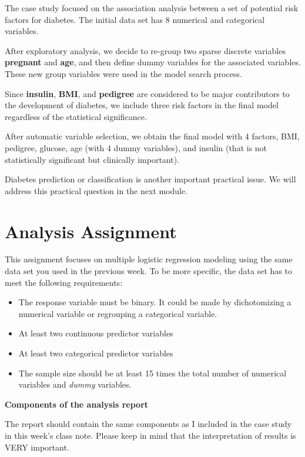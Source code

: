 \documentclass[
]{book}
\begin{document}
The case study focused on the association analysis between a set of potential risk factors for diabetes. The initial data set has 8 numerical and categorical variables.

After exploratory analysis, we decide to re-group two sparse discrete variables \textbf{pregnant} and \textbf{age}, and then define dummy variables for the associated variables. These new group variables were used in the model search process.

Since \textbf{insulin}, \textbf{BMI}, and \textbf{pedigree} are considered to be major contributors to the development of diabetes, we include three risk factors in the final model regardless of the statistical significance.

After automatic variable selection, we obtain the final model with 4 factors, BMI, pedigree, glucose, age (with 4 dummy variables), and insulin (that is not statistically significant but clinically important).

Diabetes prediction or classification is another important practical issue. We will address this practical question in the next module.

\hypertarget{analysis-assignment-1}{%
\section{Analysis Assignment}\label{analysis-assignment-1}}

This assignment focuses on multiple logistic regression modeling using the same data set you used in the previous week. To be more specific, the data set has to meet the following requirements:

\begin{itemize}
\item
  The response variable must be binary. It could be made by dichotomizing a numerical variable or regrouping a categorical variable.
\item
  At least two continuous predictor variables
\item
  At least two categorical predictor variables
\item
  The sample size should be at least 15 times the total number of numerical variables and \emph{dummy} variables.
\end{itemize}

\textbf{Components of the analysis report}

The report should contain the same components as I included in the case study in this week's class note. Please keep in mind that the interpretation of results is VERY important.
\end{document}
